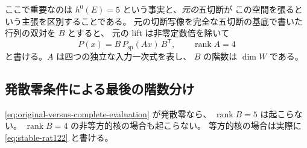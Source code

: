 ここで重要なのは $h^0(E)=5$ という事実と、\emph{元の}五切断が
この空間を張るという主張を区別することである。
元の切断写像を完全な五切断の基底で書いた行列の双対を $B$ とすると、
元の lift は非零定数倍を除いて
\begin{equation}
 P(x)=B\,P_{\mathrm{sp}}(Ax)\,B^{\mathsf T},
 \qquad \operatorname{rank}A=4
 \label{eq:original-versus-complete-evaluation}
\end{equation}
と書ける。$A$ は四つの独立な入力一次式を表し、
$B$ の階数は $\dim W$ である。

\subsection{発散零条件による最後の階数分け}

\begin{proposition}[二次モデルの発散零部分]
\label{prop:spinor-divergence-classification}
\eqref{eq:original-versus-complete-evaluation} が発散零なら、
$\operatorname{rank}B=5$ は起こらない。
$\operatorname{rank}B=4$ の非等方的核の場合も起こらない。
等方的核の場合は実際に \eqref{eq:stable-rat122} と書ける。
\end{proposition}

